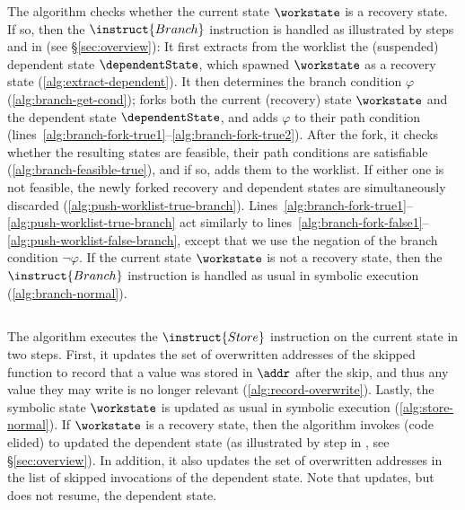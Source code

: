The algorithm checks whether the current state $\workstate$ is a
recovery state. If so, then the $\instruct{Branch}$ instruction is
handled as illustrated by steps  and  in
 (see \S\ref{sec:overview}): It first extracts from
the worklist the (suspended) dependent state $\dependentState$, which
spawned $\workstate$ as a recovery state
(\cref{alg:extract-dependent}).  It then determines the branch
condition $\varphi$ (\cref{alg:branch-get-cond}); forks both the
current (recovery) state $\workstate$ and the dependent state
$\dependentState$, and adds $\varphi$ to their path condition
(lines~\ref{alg:branch-fork-true1}--\ref{alg:branch-fork-true2}).
After the fork, it checks whether the resulting states are feasible,
\ie their path conditions are satisfiable
(\cref{alg:branch-feasible-true}), and if so, adds them to the
worklist. If either one is not feasible, the newly forked recovery and
dependent states are simultaneously discarded
(\cref{alg:push-worklist-true-branch}).
Lines~\ref{alg:branch-fork-true1}--\ref{alg:push-worklist-true-branch}
act similarly to
lines~\ref{alg:branch-fork-false1}--\ref{alg:push-worklist-false-branch},
except that we use the negation of the branch condition
$\neg\varphi$. If the current state $\workstate$ is not a recovery
state, then the $\instruct{Branch}$ instruction is handled as usual in
symbolic execution (\cref{alg:branch-normal}).

\subsection{}

The algorithm executes the $\instruct{Store}$ instruction on the
current state in two steps. First, it updates the set of overwritten
addresses of the skipped function to record that a value was stored in
$\addr$ after the skip, and thus any value they may write is no longer
relevant (\cref{alg:record-overwrite}). Lastly, the symbolic state
$\workstate$ is updated as usual in symbolic execution
(\cref{alg:store-normal}). If $\workstate$ is a recovery state, then
the algorithm invokes
 (code elided) to
updated the dependent state (as illustrated by step  in
, see \S\ref{sec:overview}). In addition, it also
updates the set of overwritten addresses in the list of skipped
invocations of the dependent state. Note that
 updates, but
does not resume, the dependent state.

